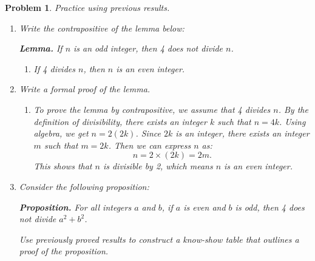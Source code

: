 \documentclass[12pt]{article}
\newtheorem{problem}{Problem} %
\theoremstyle{definition}
\begin{document}
\begin{problem}
Practice using previous results.
\begin{enumerate}[label=(\alph*)]
    \item Write the contrapositive of the lemma below:    
    
    \textbf{Lemma.} If \( n \) is an odd integer, then 4 does not divide \( n \).
        \begin{enumerate}[label=(\alph*)]
            \item If 4 divides \( n \), then \( n \) is an even integer.
        
        \end{enumerate}
    \item Write a formal proof of the lemma.
        \begin{enumerate}[label=(\alph*)]
            \item To prove the lemma by contrapositive, we assume that 4 divides \( n \). By the definition of divisibility, there exists an integer \( k \) such that \( n = 4k \). Using algebra, we get \( n = 2(2k) \). Since \( 2k \) is an integer, there exists an integer \( m \) such that \( m = 2k \). Then we can express \( n \) as:
            \[
            n = 2 \times (2k) = 2m.
            \]
            This shows that \( n \) is divisible by 2, which means \( n \) is an even integer.
            
        \end{enumerate}
    
    \item Consider the following proposition:
    
    \textbf{Proposition.} For all integers \( a \) and \( b \), if \( a \) is even and \( b \) is odd, then 4 does not divide \( a^2 + b^2 \).
    
    Use previously proved results to construct a know-show table that outlines a proof of the proposition.


\end{enumerate}
\end{problem}
\end{document}
